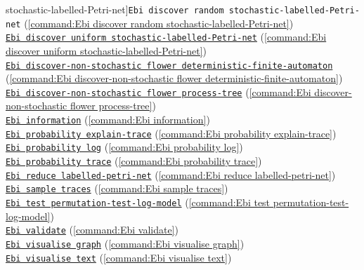 {stochastic-labelled-Petri-net]{\texttt{Ebi discover random stochastic-labelled-Petri-net}} (\cref{command:Ebi discover random stochastic-labelled-Petri-net})\\\null\qquad\hyperref[command:Ebi discover uniform stochastic-labelled-Petri-net]{\texttt{Ebi discover uniform stochastic-labelled-Petri-net}} (\cref{command:Ebi discover uniform stochastic-labelled-Petri-net})\\\null\qquad\hyperref[command:Ebi discover-non-stochastic flower deterministic-finite-automaton]{\texttt{Ebi discover-non-stochastic flower deterministic-finite-automaton}} (\cref{command:Ebi discover-non-stochastic flower deterministic-finite-automaton})\\\null\qquad\hyperref[command:Ebi discover-non-stochastic flower process-tree]{\texttt{Ebi discover-non-stochastic flower process-tree}} (\cref{command:Ebi discover-non-stochastic flower process-tree})\\\null\qquad\hyperref[command:Ebi information]{\texttt{Ebi information}} (\cref{command:Ebi information})\\\null\qquad\hyperref[command:Ebi probability explain-trace]{\texttt{Ebi probability explain-trace}} (\cref{command:Ebi probability explain-trace})\\\null\qquad\hyperref[command:Ebi probability log]{\texttt{Ebi probability log}} (\cref{command:Ebi probability log})\\\null\qquad\hyperref[command:Ebi probability trace]{\texttt{Ebi probability trace}} (\cref{command:Ebi probability trace})\\\null\qquad\hyperref[command:Ebi reduce labelled-petri-net]{\texttt{Ebi reduce labelled-petri-net}} (\cref{command:Ebi reduce labelled-petri-net})\\\null\qquad\hyperref[command:Ebi sample traces]{\texttt{Ebi sample traces}} (\cref{command:Ebi sample traces})\\\null\qquad\hyperref[command:Ebi test permutation-test-log-model]{\texttt{Ebi test permutation-test-log-model}} (\cref{command:Ebi test permutation-test-log-model})\\\null\qquad\hyperref[command:Ebi validate]{\texttt{Ebi validate}} (\cref{command:Ebi validate})\\\null\qquad\hyperref[command:Ebi visualise graph]{\texttt{Ebi visualise graph}} (\cref{command:Ebi visualise graph})\\\null\qquad\hyperref[command:Ebi visualise text]{\texttt{Ebi visualise text}} (\cref{command:Ebi visualise text})
}
